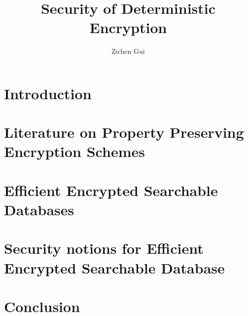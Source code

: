 \documentclass[10pt]{report}
\title{Security of Deterministic Encryption}
\author{Zichen Gui}
\begin{document}


\tableofcontents




\chapter{Introduction}


\chapter{Literature on Property Preserving Encryption Schemes}


\chapter{Efficient Encrypted Searchable Databases}


\chapter{Security notions for Efficient Encrypted Searchable Database}


\chapter{Conclusion}




{}

\appendix



\end{document}
